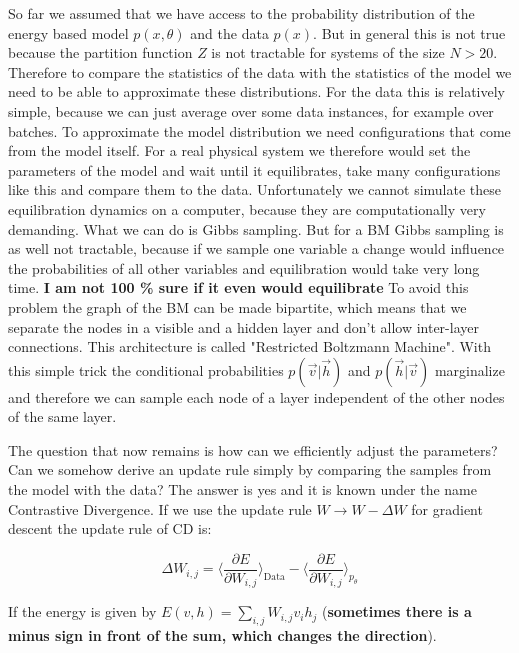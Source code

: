\documentclass[nofootinbib, superscriptaddress, prl]{revtex4}
\begin{document}
So far we assumed that we have access to the probability distribution of the energy based model $p(x, \theta)$ and the data $p(x)$. But in general this is not true because the partition function $Z$ is not tractable for systems of the size $N>20$. Therefore to compare the statistics of the data with the statistics of the model we need to be able to approximate these distributions. For the data this is relatively simple, because we can just average over some data instances, for example over batches. To approximate the model distribution we need configurations that come from the model itself. For a real physical system we therefore would set the parameters of the model and wait until it equilibrates, take many configurations like this and compare them to the data. 
Unfortunately we cannot simulate these equilibration dynamics on a computer, because they are computationally very demanding. What we can do is Gibbs sampling. But for a BM Gibbs sampling is as well not tractable, because if we sample one variable a change would influence the probabilities of all other variables and equilibration would take very long time. \textbf{I am not 100 \% sure if it even would equilibrate} To avoid this problem the graph of the BM can be made bipartite, which means that we separate the nodes in a visible and a hidden layer and don't allow inter-layer connections. This architecture is called "Restricted Boltzmann Machine". With this simple trick the conditional probabilities $p(\vec{v}|\vec{h})$ and $p(\vec{h}|\vec{v})$ marginalize and therefore we can sample each node of a layer independent of the other nodes of the same layer. 

The question that now remains is how can we efficiently adjust the parameters? Can we somehow derive an update rule simply by comparing the samples from the model with the data? The answer is yes and it is known under the name Contrastive Divergence. If we use the update rule $W \rightarrow W - \Delta W$ for gradient descent the update rule of CD is:

\begin{equation*}
	\Delta W_{i,j} = \langle \frac{ \partial E}{\partial W_{i,j}} \rangle_{\text{Data}} - \langle \frac{\partial E}{\partial W_{i,j}} \rangle_{p_{\theta}} %
\end{equation*}

If the energy is given by $E(v,h) = \sum_{i,j} W_{i,j} v_i h_j $ (\textbf{sometimes there is a minus sign in front of the sum, which changes the direction}).
\end{document}
